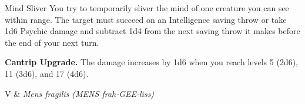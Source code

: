 \begin{Spell}[
  level=Cantrip,
  time=1 Action,
  range=60 ft,
  components={V},
  duration=1 Round,
  school=Enchantment,
  attack=INT Save,
  effect=Psychic
]{Mind Sliver}
You try to temporarily sliver the mind of one creature you can see within range. The target must succeed on an Intelligence saving throw or take 1d6 Psychic damage and subtract 1d4 from the next saving throw it makes before the end of your next turn.

\textbf{Cantrip Upgrade.} The damage increases by 1d6 when you reach levels 5 (2d6), 11 (3d6), and 17 (4d6).

\begin{components}
V & \textit{Mens fragilis (MENS frah-GEE-liss)}
\end{components}
\end{Spell}


